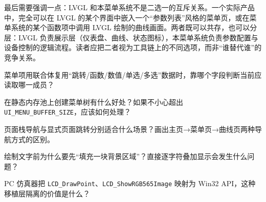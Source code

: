 最后需要强调一点：LVGL 和本菜单系统不是二选一的互斥关系。一个实际产品中，完全可以在 LVGL 的某个界面中嵌入一个“参数列表”风格的菜单页，或在菜单系统的某个函数项中调用 LVGL 绘制的曲线画面。两者既可以共存，也可以分层：LVGL 负责展示层（仪表盘、曲线、状态图标），本菜单系统负责参数配置与设备控制的逻辑流程。读者应把二者视为工具链上的不同选项，而非“谁替代谁”的竞争关系。


\begin{problemset}
\item 菜单项用联合体复用“跳转/函数/数值/单选/多选”数据时，靠哪个字段判断当前应读取哪一成员？
\item 在静态内存池上创建菜单树有什么好处？如果不小心超出 \texttt{UI\_MENU\_BUFFER\_SIZE}，应该如何处理？
\item 页面栈导航与显式页面跳转分别适合什么场景？画出主页→菜单页→曲线页两种导航方式的区别。
\item 绘制文字前为什么要先“填充一块背景区域”？直接逐字符叠加显示会发生什么问题？
\item PC 仿真器把 \texttt{LCD\_DrawPoint}、\texttt{LCD\_ShowRGB565Image} 映射为 Win32 API，这种移植层隔离的价值是什么？
\end{problemset}
